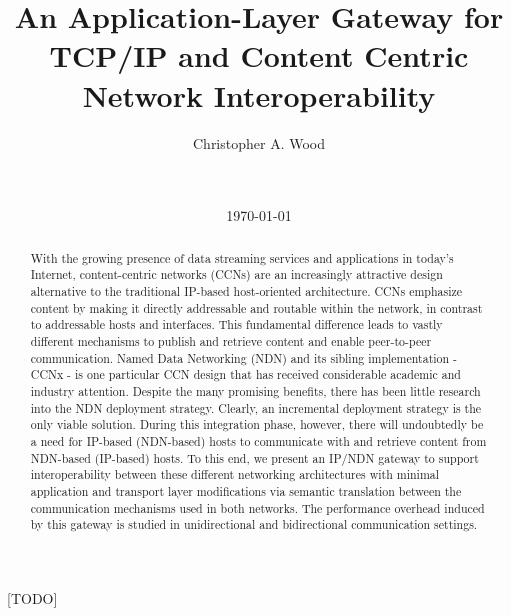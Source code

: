 \documentclass{sigcomm}
\begin{document}
\title{An Application-Layer Gateway for TCP/IP and Content Centric Network Interoperability}

\author{
\alignauthor
Christopher A. Wood\\
       \\
       \\
}

\date{\today}

\maketitle
\begin{abstract}
With the growing presence of data streaming services and applications in today's Internet, content-centric networks (CCNs) are an increasingly attractive design alternative to the traditional IP-based host-oriented architecture. CCNs emphasize content by making it directly addressable and routable within the network, in contrast to addressable hosts and interfaces. This fundamental difference leads to vastly different mechanisms to publish and retrieve content and enable peer-to-peer communication. Named Data Networking (NDN) and its sibling implementation - CCNx - is one particular CCN design that has received considerable academic and industry attention. Despite the many promising benefits, there has been little research into the NDN deployment strategy. Clearly, an incremental deployment strategy is the only viable solution. During this integration phase, however, there will undoubtedly be a need for IP-based (NDN-based) hosts to communicate with and retrieve content from NDN-based (IP-based) hosts. To this end, we present an IP/NDN gateway to support interoperability between these different networking architectures with minimal application and transport layer modifications via semantic translation between the communication mechanisms used in both networks. The performance overhead induced by this gateway is studied in unidirectional and bidirectional communication settings.
\end{abstract}

[TODO]












\end{document}
